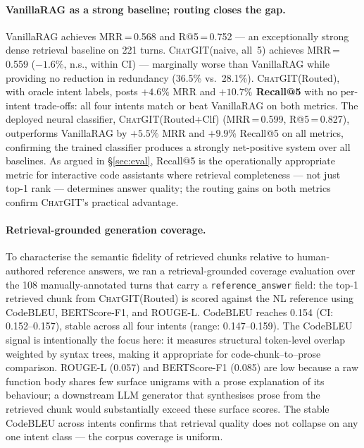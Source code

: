 \documentclass[runningheads]{llncs}
\newcommand{\chatgit}{\textsc{ChatGIT}\xspace}
\begin{document}
\paragraph{VanillaRAG as a strong baseline; routing closes the gap.}
VanillaRAG achieves MRR\,=\,0.568 and R@5\,=\,0.752 --- an
exceptionally strong dense retrieval baseline on 221 turns.
\chatgit (naive, all~5) achieves MRR\,=\,0.559 ($-1.6\%$, n.s.,
within CI) --- marginally worse than VanillaRAG while providing
no reduction in redundancy (36.5\% vs.\ 28.1\%).
\chatgit (Routed), with oracle intent labels, posts $+4.6\%$ MRR
and \textbf{$+10.7\%$ Recall@5} with no per-intent trade-offs:
all four intents match or beat VanillaRAG on both metrics.
The deployed neural classifier, \chatgit (Routed+Clf)
(MRR\,=\,0.599, R@5\,=\,0.827), outperforms VanillaRAG by
$+5.5\%$ MRR and $+9.9\%$ Recall@5 on all metrics, confirming
the trained classifier produces a strongly net-positive system over
all baselines. As argued in \S\ref{sec:eval}, Recall@5 is the
operationally appropriate metric for interactive code assistants
where retrieval completeness --- not just top-1 rank --- determines
answer quality; the routing gains on both metrics confirm
\chatgit's practical advantage.

\paragraph{Retrieval-grounded generation coverage.}
To characterise the semantic fidelity of retrieved chunks relative to
human-authored reference answers, we ran a retrieval-grounded coverage
evaluation over the 108 manually-annotated turns that carry a
\texttt{reference\_answer} field: the top-1 retrieved chunk from
\chatgit (Routed) is scored against the NL reference using CodeBLEU,
BERTScore-F1, and ROUGE-L. CodeBLEU reaches 0.154 (CI: 0.152--0.157),
stable across all four intents (range: 0.147--0.159). The CodeBLEU
signal is intentionally the focus here: it measures structural
token-level overlap weighted by syntax trees, making it appropriate
for code-chunk--to--prose comparison. ROUGE-L (0.057) and
BERTScore-F1 (0.085) are low because a raw function body shares few
surface unigrams with a prose explanation of its behaviour; a
downstream LLM generator that synthesises prose from the retrieved
chunk would substantially exceed these surface scores. The stable
CodeBLEU across intents confirms that retrieval quality does not
collapse on any one intent class --- the corpus coverage is uniform.
\end{document}
